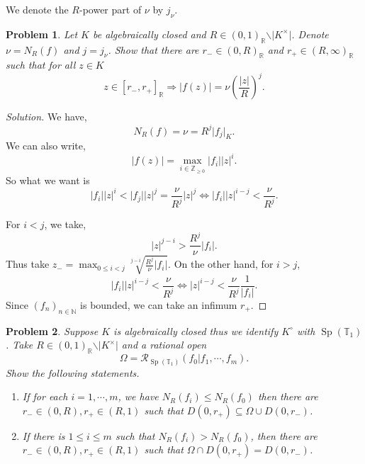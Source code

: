 \documentclass[8pt]{article}
\numberwithin{equation}{section}
\newenvironment{solution}{\begin{proof}[Solution]}{\end{proof}}
\newtheorem{problem}{Problem}[section]
\DeclareMathOperator{\Sp}{Sp}
\newcommand{\N}[0]{\mathbb{N}}
\newcommand{\R}[0]{\mathbb{R}}
\newcommand{\Z}[0]{\mathbb{Z}}
\newcommand{\T}[0]{\mathbb{T}}
\newcommand{\cR}[0]{\mathcal{R}}
\newcommand{\ab}[1]{\vert #1 \vert}
\begin{document}
We denote the $R$-power part of $\nu$ by $j_\nu$.
\begin{problem}
  Let $K$ be algebraically closed and $R\in(0,1)_\R\backslash\ab{K^\times}$. Denote $\nu=N_R(f)$ and $j=j_\nu$. Show that there are $r_-\in(0,R)_\R$ and $r_+\in(R,\infty)_\R$ such that for all $z\in K$ 
  \begin{equation*}
    z\in[r_-,r_+]_\R\Rightarrow\ab{f(z)} = \nu\left({\frac {\ab{z}} R}\right)^j.
  \end{equation*}
\end{problem}
\begin{solution}
  We have,
  \begin{equation*}
    N_R(f) = \nu = R^j\ab{f_j}_K.
  \end{equation*}
  We can also write,
  \begin{equation*}
    \ab{f(z)} = \max_{i\in\Z_{\geq0}}\ab{f_i}\ab{z}^i.
  \end{equation*}
  So what we want is 
  \begin{equation*}
    \ab{f_i}\ab{z}^i <\ab{f_j}\ab{z}^j = {\frac {\nu} {R^j}}\ab{z}^j\iff \ab{f_i}\ab{z}^{i-j} <{\frac {\nu} {R^j}}.
  \end{equation*}
  \par For $i<j$, we take,
  \begin{equation*}
    \vert z\vert^{j-i}>{\frac {R^j}\nu}\ab{f_i}.
  \end{equation*}
  Thus take $z_- = \max_{0\leq i<j}\sqrt[j-i]{{\frac {R^j}\nu}\ab{f_i}}$. On the other hand, for $i>j$, 
  \begin{equation*}
    \ab{f_i}\ab{z}^{i-j} <{\frac {\nu} {R^j}}\iff \ab{z}^{i-j} <{\frac {\nu} {R^j}}{\frac 1 {\ab{f_i}}}.
  \end{equation*}
  Since $(f_n)_{n\in\N}$ is bounded, we can take an infimum $r_+$.
\end{solution}
\begin{problem}
  Suppose $K$ is algebraically closed thus we identify $K^\circ$ with $\Sp(\T_1)$. Take $R\in(0,1)_\R\backslash\ab{K^\times}$ and a rational open 
  \begin{equation*}
    \Omega = \cR_{\Sp(\T_1)}(f_0|f_1,\cdots,f_m).
  \end{equation*}
  Show the following statements.
  \begin{enumerate}
    \item If for each $i=1,\cdots,m$, we have $N_R(f_i)\leq N_R(f_0)$ then there are $r_-\in (0,R),r_+\in (R,1)$ such that $D(0,r_+)\subseteq\Omega\cup D(0,r_-)$.
    \item If there is $1\leq i\leq m$ such that $N_R(f_i)>N_R(f_0)$, then there are $r_-\in (0,R),r_+\in (R,1)$ such that $\Omega\cap D(0,r_+)=D(0,r_-)$.
  \end{enumerate}
\end{problem}
\end{document}
